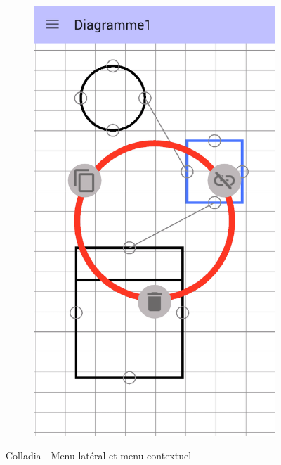 \begin{itemize}
\begin{figure}[!h]
\begin{subfigure}[t]{.3\textwidth}
				\includegraphics[width=\textwidth]{img/screen/new/colladia_draw_view_menu_contextuel_select}
			\end{subfigure}
			\caption{Colladia - Menu latéral et menu contextuel}
		\end{figure}
		\vspace*{\fill}
		

\end{itemize}
